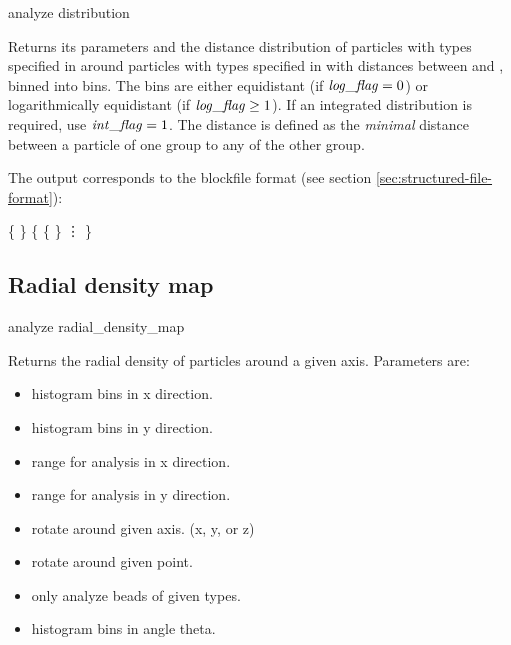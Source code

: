 \begin{essyntax}
  analyze distribution  
\end{essyntax}
Returns its parameters and the distance distribution of particles with
types specified in  around particles with
types specified in  with distances between
 and , binned into  bins. The
bins are either equidistant (if $\mathrm{\mathit{log\_flag}} = 0$) or
logarithmically equidistant (if $\mathrm{\mathit{log\_flag}} \geq 1$). If an
integrated distribution is required, use $\mathrm{\mathit{int\_flag}}=1$. The
distance is defined as the \emph{minimal} distance between a particle
of one group to any of the other group.


The output corresponds to the blockfile format (see section
\vref{sec:structured-file-format}):
\begin{code}
\{  \} 
\{ 
  \{   \} 
  \vdots 
\}
\end{code}

\subsection{Radial density map}
\label{analyze:radialdensitymap}

\begin{essyntax}
  analyze radial_density_map    
\end{essyntax}

Returns the radial density of particles around a given
axis. Parameters are:


\begin{itemize}
\item {} histogram bins in x direction.
\item {} histogram bins in y direction.
\item {} range for analysis in x direction.
\item {} range for analysis in y direction.
\item {} rotate around given axis. (x, y, or z)
\item {} rotate around given point.
\item {} only analyze beads of given types.
\item {} histogram bins in angle theta.
\end{itemize}

